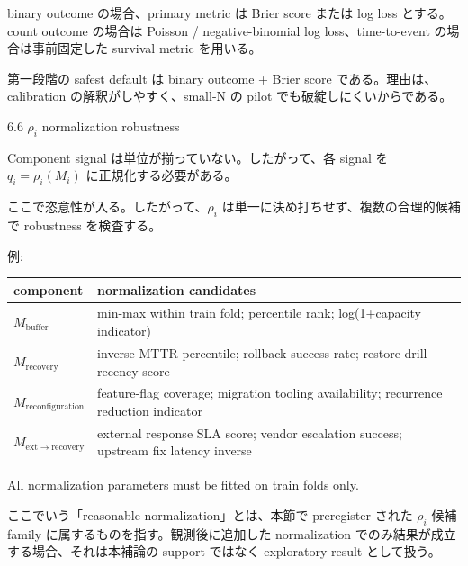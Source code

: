 \documentclass[12pt,a4paper]{article}
\begin{document}
binary outcome の場合、primary metric は Brier score または log loss とする。count outcome の場合は Poisson / negative-binomial log loss、time-to-event の場合は事前固定した survival metric を用いる。

第一段階の safest default は binary outcome + Brier score である。理由は、calibration の解釈がしやすく、small-N の pilot でも破綻しにくいからである。

6.6 \(\rho_i\) normalization robustness

Component signal は単位が揃っていない。したがって、各 signal を \(q_i=\rho_i(M_i)\) に正規化する必要がある。

ここで恣意性が入る。したがって、\(\rho_i\) は単一に決め打ちせず、複数の合理的候補で robustness を検査する。

例:

{\def\LTcaptype{table} %
\begin{longtable}[]{@{}
  >{\raggedright\arraybackslash}p{}
  >{\raggedright\arraybackslash}p{}@{}}
\toprule\noalign{}
\begin{minipage}[b]{\linewidth}\raggedright
component
\end{minipage} & \begin{minipage}[b]{\linewidth}\raggedright
normalization candidates
\end{minipage} \\
\midrule\noalign{}
\endhead
\bottomrule\noalign{}
\endlastfoot
\(M_{\mathrm{buffer}}\) & min-max within train fold; percentile rank; log(1+capacity indicator) \\
\(M_{\mathrm{recovery}}\) & inverse MTTR percentile; rollback success rate; restore drill recency score \\
\(M_{\mathrm{reconfiguration}}\) & feature-flag coverage; migration tooling availability; recurrence reduction indicator \\
\(M_{\mathrm{ext}\to\mathrm{recovery}}\) & external response SLA score; vendor escalation success; upstream fix latency inverse \\
\end{longtable}
}

All normalization parameters must be fitted on train folds only.

ここでいう「reasonable normalization」とは、本節で preregister された \(\rho_i\) 候補 family に属するものを指す。観測後に追加した normalization でのみ結果が成立する場合、それは本補論の support ではなく exploratory result として扱う。
\end{document}
